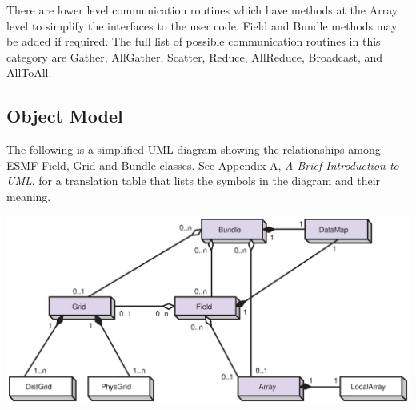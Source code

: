 There are lower level communication routines which have methods
at the Array level to simplify the interfaces to the user code.
Field and Bundle methods may be added if required.
The full list of possible communication routines in this category
are Gather, AllGather, Scatter, Reduce,
AllReduce, Broadcast, and AllToAll.

\newpage
\subsection{Object Model}

The following is a simplified UML diagram showing the relationships among
ESMF Field, Grid and Bundle classes.  See Appendix A, {\it A Brief 
Introduction to UML},
for a translation table that lists the symbols in the diagram and their 
meaning.

\begin{center}
\includegraphics{Bundle_obj.eps}   
\end{center}

